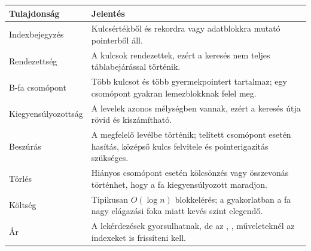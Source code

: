 \begin{tabularx}{\textwidth}{L{32mm}X}
\toprule
\textbf{Tulajdonság} & \textbf{Jelentés} \\
\midrule
Indexbejegyzés & Kulcsértékből és rekordra vagy adatblokkra mutató pointerből áll. \\
Rendezettség & A kulcsok rendezettek, ezért a keresés nem teljes táblabejárással történik. \\
B-fa csomópont & Több kulcsot és több gyermekpointert tartalmaz; egy csomópont gyakran lemezblokknak felel meg. \\
Kiegyensúlyozottság & A levelek azonos mélységben vannak, ezért a keresés útja rövid és kiszámítható. \\
Beszúrás & A megfelelő levélbe történik; telített csomópont esetén hasítás, középső kulcs felvitele és pointerigazítás szükséges. \\
Törlés & Hiányos csomópont esetén kölcsönzés vagy összevonás történhet, hogy a fa kiegyensúlyozott maradjon. \\
Költség & Tipikusan \(O(\log n)\) blokkelérés; a gyakorlatban a fa nagy elágazási foka miatt kevés szint elegendő. \\
Ár & A lekérdezések gyorsulhatnak, de az , ,  műveleteknél az indexeket is frissíteni kell. \\
\bottomrule
\end{tabularx}

